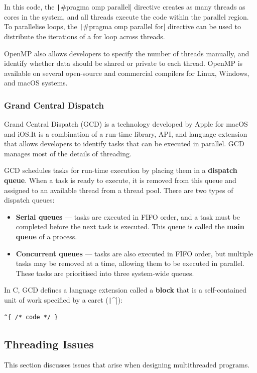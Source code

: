 \documentclass{article}
\begin{document}
\inputminted{c}{code/openmp.c}

In this code, the \texttt|#pragma omp parallel| directive
creates as many threads as cores in the system, and all threads execute
the code within the parallel region. To parallelise loops, the
\texttt|#pragma omp parallel for| directive can be used to
distribute the iterations of a for loop across threads.

OpenMP also allows developers to specify the number of threads
manually, and identify whether data should be shared or private to each
thread. OpenMP is available on several open-source and commercial
compilers for Linux, Windows, and macOS systems.
\subsubsection{Grand Central Dispatch}
Grand Central Dispatch (GCD) is a technology developed by Apple for
macOS and iOS.\@ It is a combination of a run-time library, API, and
language extension that allows developers to identify tasks that can be
executed in parallel. GCD manages most of the details of threading.

GCD schedules tasks for run-time execution by placing them in a
\textbf{dispatch queue}. When a task is ready to execute, it is removed
from this queue and assigned to an available thread from a thread pool.
There are two types of dispatch queues:
\begin{itemize}
    \item \textbf{Serial queues} --- tasks are executed in FIFO order,
          and a task must be completed before the next task is executed.
          This queue is called the \textbf{main queue} of a process.
    \item \textbf{Concurrent queues} --- tasks are also executed in
          FIFO order, but multiple tasks may be removed at a time,
          allowing them to be executed in parallel.
          These tasks are prioritised into three system-wide queues.
\end{itemize}
In C, GCD defines a language extension called a \textbf{block} that is a
self-contained unit of work specified by a caret (\texttt|^|):
\begin{verbatim}
^{ /* code */ }
\end{verbatim}
\subsection{Threading Issues}
This section discusses issues that arise when designing multithreaded
programs.
\end{document}
